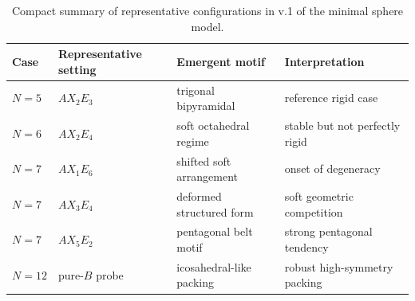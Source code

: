 \begin{table}[ht]
\centering
\caption{Compact summary of representative configurations in v.1 of the minimal sphere model.}
\label{tab:v1_summary}
\begin{tabular}{llll}
\hline
Case & Representative setting & Emergent motif & Interpretation \\
\hline
$N=5$ & $AX_2E_3$ & trigonal bipyramidal & reference rigid case \\
$N=6$ & $AX_2E_4$ & soft octahedral regime & stable but not perfectly rigid \\
$N=7$ & $AX_1E_6$ & shifted soft arrangement & onset of degeneracy \\
$N=7$ & $AX_3E_4$ & deformed structured form & soft geometric competition \\
$N=7$ & $AX_5E_2$ & pentagonal belt motif & strong pentagonal tendency \\
$N=12$ & pure-$B$ probe & icosahedral-like packing & robust high-symmetry packing \\
\hline
\end{tabular}
\end{table}